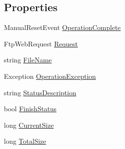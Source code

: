 \subsection*{Properties}
\begin{DoxyCompactItemize}
\item 
Manual\+Reset\+Event \hyperlink{classgearit_1_1src_1_1server_1_1ftpclient_1_1_ftp_state_ad5fc8591e584ad44541ff034ad980e1b}{Operation\+Complete}
\item 
Ftp\+Web\+Request \hyperlink{classgearit_1_1src_1_1server_1_1ftpclient_1_1_ftp_state_a004f528438bbb21f88c1d123375e5de0}{Request}
\item 
string \hyperlink{classgearit_1_1src_1_1server_1_1ftpclient_1_1_ftp_state_a31b99ea06dca54f0b0b1e9ff4b28cc7a}{File\+Name}
\item 
Exception \hyperlink{classgearit_1_1src_1_1server_1_1ftpclient_1_1_ftp_state_a6b1daf0391715080acb60b2cd3eebb68}{Operation\+Exception}
\item 
string \hyperlink{classgearit_1_1src_1_1server_1_1ftpclient_1_1_ftp_state_ae21c66d5623609f3346ebd4de42abf3a}{Status\+Description}
\item 
bool \hyperlink{classgearit_1_1src_1_1server_1_1ftpclient_1_1_ftp_state_aa7c4e6ebc4fdabc2a3cd737ffe0e3abf}{Finish\+Status}
\item 
long \hyperlink{classgearit_1_1src_1_1server_1_1ftpclient_1_1_ftp_state_a989d0ed7e4753dca05964aefd2c5b895}{Current\+Size}
\item 
long \hyperlink{classgearit_1_1src_1_1server_1_1ftpclient_1_1_ftp_state_a4c3b21f69e3c6acc8751f80d27973632}{Total\+Size}
\end{DoxyCompactItemize}



